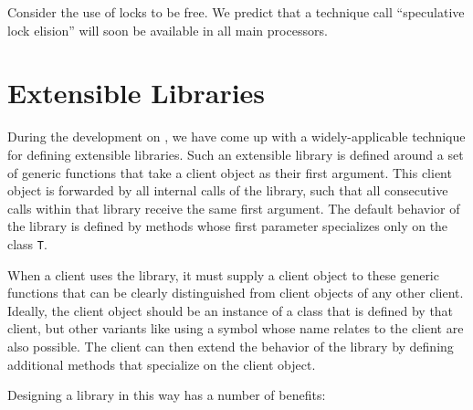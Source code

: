 Consider the use of locks to be free.  We predict that a technique
call ``speculative lock elision'' will soon be available in all main
processors.

\section{Extensible Libraries}

During the development on \sysname{}, we have come up with a
widely-applicable technique for defining extensible libraries.  Such an
extensible library is defined around a set of generic functions that take a
client object as their first argument.  This client object is forwarded by
all internal calls of the library, such that all consecutive calls within
that library receive the same first argument.  The default behavior of the
library is defined by methods whose first parameter specializes only on the
class \texttt{T}.

When a client uses the library, it must supply a client object to these
generic functions that can be clearly distinguished from client objects of
any other client.  Ideally, the client object should be an instance of a
class that is defined by that client, but other variants like using a
symbol whose name relates to the client are also possible.  The client can
then extend the behavior of the library by defining additional methods that
specialize on the client object.

Designing a library in this way has a number of benefits:

